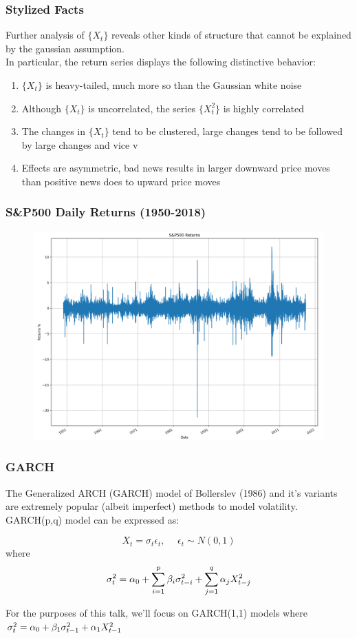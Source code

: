 \documentclass{beamer}
\begin{document}
\begin{frame}
\frametitle{Stylized Facts}
Further analysis of $\{X_t\}$ reveals other kinds of structure that cannot be explained by the gaussian assumption.\\
\vspace{0.5cm}
In particular, the return series displays the following distinctive behavior:

\begin{enumerate}
\item{$\{X_t\}$ is heavy-tailed, much more so than the Gaussian white noise}
\item{Although $\{X_t\}$ is uncorrelated, the series $\{X_{t}^2\}$ is highly correlated}
\item{The changes in $\{X_t\}$ tend to be clustered, large changes tend to be followed by large changes and vice v}
\item{Effects are asymmetric, bad news results in larger downward price moves than positive news does to upward price moves}
\end{enumerate}
\end{frame}

\begin{frame}
\frametitle{S&P500 Daily Returns (1950-2018)}
\begin{figure}[h!]
\centering 
\includegraphics[width=\textwidth]{sp500_returns.png}
\end{figure}
\end{frame}


\begin{frame}
\frametitle{GARCH}
The Generalized ARCH (GARCH) model of Bollerslev (1986) and it's variants are extremely popular (albeit imperfect) methods to model volatility.\\
\vspace{15pt}
GARCH(p,q) model can be expressed as:

$$ X_t = \sigma_{t}\epsilon_{t}, \hspace{15pt} \epsilon_{t} \sim N(0,1) $$
where $$\sigma_{t}^{2} = \alpha_0 + \sum_{i=1}^{p} \beta_i \sigma_{t-i}^{2} + \sum_{j=1}^{q} \alpha_j X_{t-j}^{2}$$

For the purposes of this talk, we'll focus on GARCH(1,1) models where $\sigma_{t}^{2} = \alpha_0 + \beta_1 \sigma_{t-1}^{2} + \alpha_1 X_{t-1}^{2}$
\end{frame}
\end{document}

